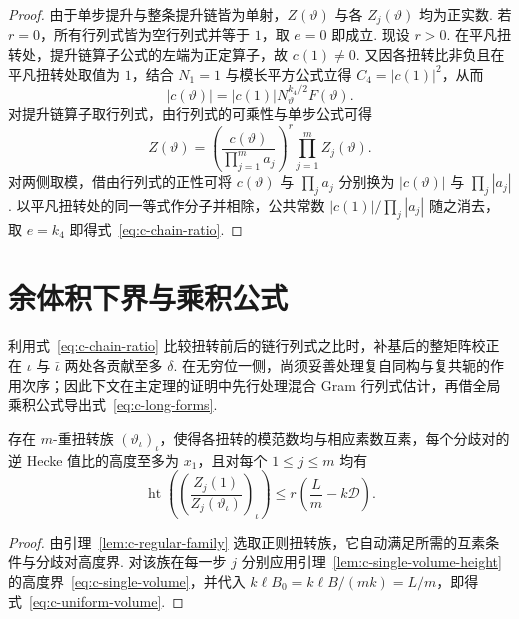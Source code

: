 \begin{proof}
由于单步提升与整条提升链皆为单射，$Z(\vartheta)$ 与各 $Z_j(\vartheta)$ 均为正实数. 若 $r=0$，所有行列式皆为空行列式并等于 $1$，取 $e=0$ 即成立. 现设 $r>0$. 在平凡扭转处，提升链算子公式的左端为正定算子，故 $c(1)\ne0$. 又因各扭转比非负且在平凡扭转处取值为 $1$，结合 $N_1=1$ 与模长平方公式立得 $C_4=|c(1)|^2$，从而
\[
 |c(\vartheta)|=|c(1)|N_\vartheta^{k_4/2}F(\vartheta).
\]
对提升链算子取行列式，由行列式的可乘性与单步公式可得
\[
 Z(\vartheta)
 =\left(\frac{c(\vartheta)}{\prod_{j=1}^m a_j}\right)^r
       \prod_{j=1}^m Z_j(\vartheta).
\]
对两侧取模，借由行列式的正性可将 $c(\vartheta)$ 与 $\prod_j a_j$ 分别换为 $|c(\vartheta)|$ 与 $\prod_j |a_j|$. 以平凡扭转处的同一等式作分子并相除，公共常数 $|c(1)|/\prod_j |a_j|$ 随之消去，取 $e=k_4$ 即得式~\eqref{eq:c-chain-ratio}.
\end{proof}

\section{余体积下界与乘积公式}
\label{sec:c-covolume}

利用式~\eqref{eq:c-chain-ratio} 比较扭转前后的链行列式之比时，补基后的整矩阵校正在 $\iota$ 与 $\bar\iota$ 两处各贡献至多 $\delta$. 在无穷位一侧，尚须妥善处理复自同构与复共轭的作用次序；因此下文在主定理的证明中先行处理混合 Gram 行列式估计，再借全局乘积公式导出式~\eqref{eq:c-long-forms}.

\begin{lemma}[各步同时满足高度界的扭转族]
\label{lem:c-good-twists-volume}
\emitthmsource
存在 $m$-重扭转族 $(\vartheta_\iota)_\iota$，使得各扭转的模范数均与相应素数互素，每个分歧对的逆 Hecke 值比的高度至多为 $x_1$，且对每个 $1\le j\le m$ 均有
\begin{equation}
 \operatorname{ht}\left(\left(\frac{Z_j(1)}{Z_j(\vartheta_\iota)}\right)_\iota\right)
 \le r\left(\frac{L}{m}-k\mathcal D\right).
\label{eq:c-uniform-volume}
\end{equation}
\end{lemma}
\begin{proof}
由引理~\ref{lem:c-regular-family} 选取正则扭转族，它自动满足所需的互素条件与分歧对高度界. 对该族在每一步 $j$ 分别应用引理~\ref{lem:c-single-volume-height} 的高度界~\eqref{eq:c-single-volume}，并代入 $k\ell B_0=k\ell B/(mk)=L/m$，即得式~\eqref{eq:c-uniform-volume}.
\end{proof}

